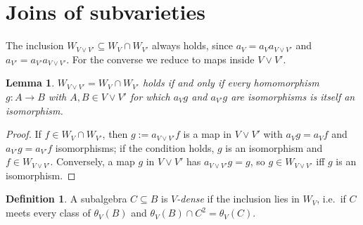 \documentclass[11pt]{amsart}
\newtheorem{lem}[thm]{Lemma}
\theoremstyle{definition}
\newtheorem{defi}[thm]{Definition}
\begin{document}
\section{Joins of subvarieties}\label{sec:joins}

The inclusion $W_{V\vee V'}\subseteq W_V\cap W_{V'}$ always holds, since
$a_V=a_Va_{V\vee V'}$ and $a_{V'}=a_{V'}a_{V\vee V'}$. For the converse we
reduce to maps inside $V\vee V'$.

\begin{lem}\label{lem:reduce}
$W_{V\vee V'}=W_V\cap W_{V'}$ holds if and only if every homomorphism
$g\colon A\to B$ with $A,B\in V\vee V'$ for which $a_Vg$ and $a_{V'}g$ are
isomorphisms is itself an isomorphism.
\end{lem}
\begin{proof}
If $f\in W_V\cap W_{V'}$, then $g:=a_{V\vee V'}f$ is a map in $V\vee V'$ with
$a_Vg=a_Vf$ and $a_{V'}g=a_{V'}f$ isomorphisms; if the condition holds, $g$ is an
isomorphism and $f\in W_{V\vee V'}$. Conversely, a map $g$ in $V\vee V'$ has
$a_{V\vee V'}g=g$, so $g\in W_{V\vee V'}$ iff $g$ is an isomorphism.
\end{proof}

\begin{defi}
A subalgebra $C\subseteq B$ is \emph{$V$-dense} if the inclusion lies in $W_V$,
i.e.\ if $C$ meets every class of $\theta_V(B)$ and $\theta_V(B)\cap C^2=\theta_V(C)$.
\end{defi}
\end{document}
